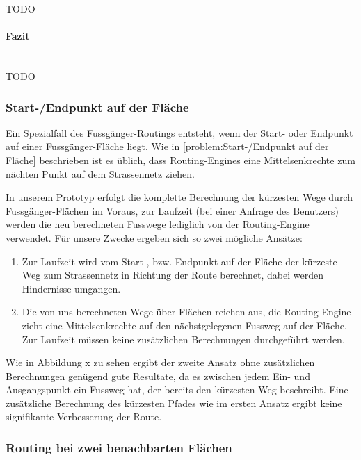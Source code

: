 TODO

\paragraph{Fazit}~\\

TODO

\subsubsection{Start-/Endpunkt auf der Fläche}
\label{subsub:Start-/Endpunkt auf der Fläche}
Ein Spezialfall des Fussgänger-Routings entsteht, wenn der Start- oder Endpunkt auf einer Fussgänger-Fläche liegt. Wie in \ref{problem:Start-/Endpunkt auf der Fläche} beschrieben ist es üblich, dass Routing-Engines eine Mittelsenkrechte zum nächten Punkt auf dem Strassennetz ziehen.

In unserem Prototyp erfolgt die komplette Berechnung der kürzesten Wege durch Fussgänger-Flächen im Voraus, zur Laufzeit (bei einer Anfrage des Benutzers) werden die neu berechneten Fusswege lediglich von der Routing-Engine verwendet. Für unsere Zwecke ergeben sich so zwei mögliche Ansätze:

\begin{enumerate}
    \item Zur Laufzeit wird vom Start-, bzw. Endpunkt auf der Fläche der kürzeste Weg zum Strassennetz in Richtung der Route berechnet, dabei werden Hindernisse umgangen.
    \item Die von uns berechneten Wege über Flächen reichen aus, die Routing-Engine zieht eine Mittelsenkrechte auf den nächstgelegenen Fussweg auf der Fläche. Zur Laufzeit müssen keine zusätzlichen Berechnungen durchgeführt werden.
\end{enumerate}


Wie in Abbildung x zu sehen ergibt der zweite Ansatz ohne zusätzlichen Berechnungen genügend gute Resultate, da es zwischen jedem Ein- und Ausgangspunkt ein Fussweg hat, der bereits den kürzesten Weg beschreibt. Eine zusätzliche Berechnung des kürzesten Pfades wie im ersten Ansatz ergibt keine signifikante Verbesserung der Route.

\subsubsection{Routing bei zwei benachbarten Flächen}
\label{subsub:Routing bei zwei benachbarten Flächen}

